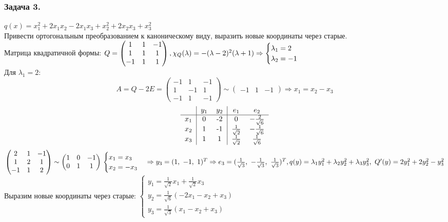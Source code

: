 \documentclass[12pt, letterpaper, twoside]{article}
\begin{document}
\subsubsection*{Задача 3.}
$q(x) = x_1^2 + 2x_1x_2 - 2x_1x_3 + x_2^2 + 2x_2x_3 + x_3^2$\\
Привести ортогональным преобразованием к каноническому виду, выразить новые координаты через старые.\\
Матрица квадратичной формы: $Q = \begin{pmatrix}
    1 & 1 & -1\\
    1 & 1 & 1\\
    -1 & 1 & 1
\end{pmatrix},\\
\chi_Q(\lambda) = -(\lambda - 2)^2(\lambda + 1)\Rightarrow \begin{cases}
    \lambda_1 = 2\\
    \lambda_2 = -1
\end{cases}$\\
Для $\lambda_1 = 2$:
\[A = Q - 2E = \begin{pmatrix}
    -1 & 1 & -1\\
    1 & -1 & 1\\
    -1 & 1 & -1
\end{pmatrix}\sim \begin{pmatrix}
    -1 & 1 & -1
\end{pmatrix}\Rightarrow x_1 = x_2 - x_3\]
\[\begin{tabular}{c | c c | c c}
    & $y_1$ & $y_2$ & $e_1$ & $e_2$\\
    \hline
    $x_1$ & 0 & -2  & 0 & $-\frac{2}{\sqrt{6}}$\\
    $x_2$ & 1 & -1  & $\frac{1}{\sqrt{2}}$ & $-\frac{1}{\sqrt{6}}$\\
    $x_3$ & 1 & 1   & $\frac{1}{\sqrt{2}}$ & $\frac{1}{\sqrt{6}}$
\end{tabular}\]
$\begin{pmatrix}
    2 & 1 & -1\\
    1 & 2 & 1\\
    -1 & 1 & 2
\end{pmatrix}\sim \begin{pmatrix}
    1 & 0 & -1\\
    0 & 1 & 1
\end{pmatrix}\\
\begin{cases}
    x_1 = x_3\\
    x_2 = -x_3
\end{cases}\Rightarrow y_3 = (1,\ -1,\ 1)^T\Rightarrow e_3 = (\frac{1}{\sqrt{3}},\ -\frac{1}{\sqrt{3}},\ \frac{1}{\sqrt{3}})^T,\\
q(y) = \lambda_1 y_1^2 + \lambda_2 y_2^2 + \lambda_3 y_3^2,\ Q'(y) = 2y_1^2 + 2y_2^2 - y_3^2$\\
Выразим новые координаты через старые: $\begin{cases}
    y_1 = \frac{1}{\sqrt{2}} x_1 + \frac{1}{\sqrt{2}} x_3\\
    y_2 = \frac{1}{\sqrt{6}}(-2x_1 - x_2 + x_3)\\
    y_3 = \frac{1}{\sqrt{3}}(x_1 -x_2 + x_3)
\end{cases}$
\end{document}
